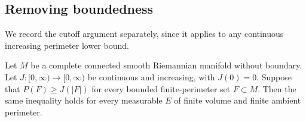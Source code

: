 \subsection{Removing boundedness}

We record the cutoff argument separately, since it applies to any
continuous increasing perimeter lower bound.

\begin{lemma}\label{lem:finite-volume-cutoff}
Let $M$ be a complete connected smooth Riemannian manifold without
boundary. Let $J:[0,\infty)\to[0,\infty)$ be continuous and increasing,
with $J(0)=0$. Suppose that $P(F)\ge J(|F|)$ for every bounded
finite-perimeter set $F\subset M$. Then the same inequality holds for
every measurable $E$ of finite volume and finite ambient perimeter.
\end{lemma}

